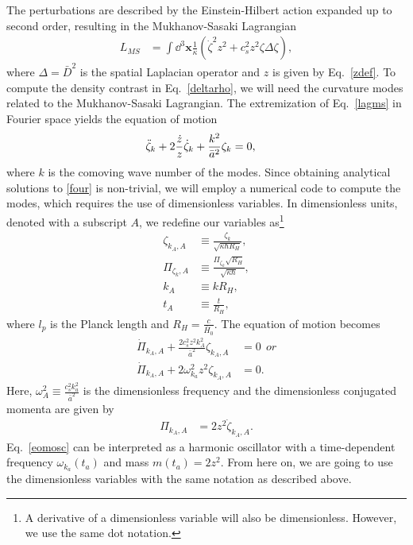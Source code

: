 \documentclass[a4paper,11pt]{article}
\begin{document}
The perturbations are described by the Einstein-Hilbert action expanded up to second order, resulting in the Mukhanov-Sasaki Lagrangian
\begin{align}
	\label{lagms}
	L_{MS} & = \int \dd^3\textbf{x} \frac{1}{ \kappa} \left({\dot{\zeta}}^2 z^2 + c_s^2 z^2 \zeta\Delta \zeta\right)
	,\end{align}
where $\Delta = \bar{D}^2$ is the spatial Laplacian operator and $z$ is given by Eq.~\eqref{zdef}.
To compute the density contrast in Eq.~\eqref{deltarho}, we will need the curvature modes related to the Mukhanov-Sasaki Lagrangian. The extremization of Eq.~\eqref{lagms} in Fourier space yields the equation of motion
\begin{align}
	\label{four}
	\Ddot{\zeta}_{k}+ 2\frac{ \dot{z} }{ z } \dot{\zeta}_k + \frac{k^2}{\bar{a}^2} \zeta_k & =0
	,\end{align}
where $k$ is the comoving wave number of the modes. Since obtaining analytical solutions to \eqref{four} is non-trivial, we will employ a numerical code to compute the modes, which requires the use of dimensionless variables. In dimensionless units, denoted with a subscript $A$, we redefine our variables as\footnote{A derivative of a dimensionless variable will also be dimensionless. However, we use the same dot notation.}
\begin{align}
	\zeta_{k_A, A}   & \equiv \frac{\zeta_{k}}{\sqrt{ \kappa \hbar R_H}},           \\
	\Pi_{\zeta_k, A} & \equiv \frac{\Pi_{\zeta_k} \sqrt{R_H}}{\sqrt{\kappa \hbar}}, \\
	\label{kadm}
	k_A              & \equiv k R_H,                                                \\
	t_A              & \equiv \frac{t}{R_H}
	,\end{align}
where $l_p$ is the Planck length and $R_H = \frac{c}{\bar{H}_0}$. The equation of motion becomes
\begin{align}
	\label{eomosc}
	\dot{\Pi}_{k_A, A}+  \frac{2 c^2_s z^2 k_A^2}{\bar{a}^2  } \zeta_{k_A, A} & =0 \nonumber~~ or \\
	\dot{\Pi}_{k_A, A}+  2 \omega_{k_a}^2 z^2  \zeta_{k_A, A}                 & =0
	.\end{align}
Here, $\omega_A^2 \equiv \frac{c_s^2 k_a^2}{\bar{a}^2}$ is the dimensionless frequency and the dimensionless conjugated momenta are given by
\begin{align}
	\Pi_{k_A, A} & = 2 z^2 \dot{\zeta}_{k_A, A}
	.\end{align}
Eq.~\eqref{eomosc} can be interpreted as a harmonic oscillator with a time-dependent frequency $\omega_{k_a}(t_a)$ and mass $m(t_a) = 2z^2$. From here on, we are going to use the dimensionless variables with the same notation as described above.
\end{document}
